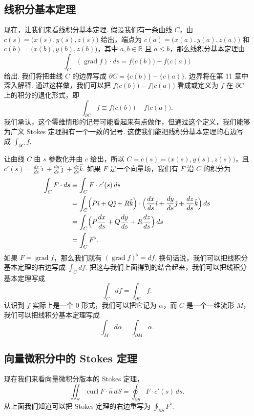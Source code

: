 \subsection{线积分基本定理}

现在，让我们来看线积分基本定理. 假设我们有一条曲线 $C$，由 $c(s)=\bigl(x(s),y(s),z(s)\bigr)$ 给出，端点为 $c(a)=\bigl(x(a),y(a),z(a)\bigr)$ 和 $c(b)=\bigl(x(b),y(b),z(b)\bigr)$，其中 $a,b\in\mathbb{R}$ 且 $a\leq b$，那么线积分基本定理由
\[
\int_C(\operatorname{grad}f)\cdot ds=f\bigl(c(b)\bigr)-f\bigl(c(a)\bigr)
\]
给出. 我们将把曲线 $C$ 的边界写成 $\partial C=\bigl\{c(b)\bigr\}-\bigl\{c(a)\bigr\}$. 边界将在第 11 章中深入解释. 通过这样做，我们可以把 $f\bigl(c(b)\bigr)-f\bigl(c(a)\bigr)$ 看成或定义为 $f$ 在 $\partial C$ 上的积分的退化形式，即
\[
\int_{\partial C}f\equiv f\bigl(c(b)\bigr)-f\bigl(c(a)\bigr).
\]
我们承认，这个零维情形的记号可能看起来有点做作，但通过这个定义，我们能够为广义 Stokes 定理拥有一个一致的记号. 这使我们能把线积分基本定理的右边写成 $\int_{\partial C}f$.

让曲线 $C$ 由 $s$ 参数化并由 $c$ 给出，所以 $C=c(s)=\bigl(x(s),y(s),z(s)\bigr)$，且 $c'(s)=\frac{dx}{ds}\hat{\imath}+\frac{dy}{ds}\hat{\jmath}+\frac{dz}{ds}\hat{k}$. 如果 $F$ 是一个向量场，我们有 $F$ 沿 $C$ 的积分为
\[
\begin{aligned}
\int_C F\cdot ds&\equiv\int_C F\cdot c'(s)\,ds\\
&=\int_C\Bigl(P\hat{\imath}+Q\hat{\jmath}+R\hat{k}\Bigr)\cdot\Bigl(\frac{dx}{ds}\hat{\imath}+\frac{dy}{ds}\hat{\jmath}+\frac{dz}{ds}\hat{k}\Bigr)\,ds\\
&=\int_C\Bigl(P\frac{dx}{ds}+Q\frac{dy}{ds}+R\frac{dz}{ds}\Bigr)\,ds\\
&=\int_C F^{\flat}.
\end{aligned}
\]
如果 $F=\operatorname{grad}f$，那么我们就有 $(\operatorname{grad}f)^{\flat}=df$. 换句话说，我们可以把线积分基本定理的右边写成 $\int_C df$. 把这与我们上面得到的结合起来，我们可以把线积分基本定理写成
\[
\int_C df=\int_{\partial C}f.
\]
认识到 $f$ 实际上是一个 0-形式，我们可以把它记为 $\alpha$，而 $C$ 是一个一维流形 $M$，我们可以把线积分基本定理写成
\[
\int_M d\alpha=\int_{\partial M}\alpha.
\]

\subsection{向量微积分中的 Stokes 定理}\label{sec:9-5-3}

现在我们来看向量微积分版本的 Stokes 定理，
\[
\iint_S\operatorname{curl}F\cdot\hat{n}\,dS=\oint_{\partial S}F\cdot c'(s)\,ds.
\]
从上面我们知道可以把 Stokes 定理的右边重写为 $\oint_{\partial S}F^{\flat}$.


